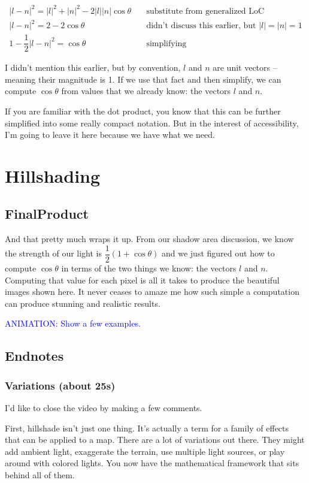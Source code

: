 \documentclass{article}
\newcommand\animation[1]{\textcolor{blue}{ANIMATION: #1}}
\begin{document}
\begin{align*}
|l-n|^2 = |l|^2 + |n|^2 - 2 |l| |n| \cos \theta & \quad \text{substitute from generalized LoC} \\
|l-n|^2 = 2 - 2 \cos \theta & \quad \text{didn't discuss this earlier, but } |l| = |n| = 1 \\
1 - \dfrac{1}{2}|l-n|^2 = \cos \theta & \quad \text{simplifying}
\end{align*}

I didn't mention this earlier, but by convention, $l$ and $n$ are unit vectors -- meaning their magnitude is 1.
If we use that fact and then simplify, we can compute $\cos \theta$ from values that we already know: the vectors $l$ and $n$.

If you are familiar with the dot product, you know that this can be further simplified into some really compact notation.
But in the interest of accessibility, I'm going to leave it here because we have what we need.

\section{Hillshading}

\subsection{FinalProduct}

And that pretty much wraps it up.
From our shadow area discussion, we know the strength of our light is $\dfrac{1}{2}(1 + \cos \theta)$ and we just figured out how to compute $\cos \theta$ in terms of the two things we know: the vectors $l$ and $n$.
Computing that value for each pixel is all it takes to produce the beautiful images shown here.
It never ceases to amaze me how such simple a computation can produce stunning and realistic results.

\animation{Show a few examples.}

\subsection{Endnotes}

\subsubsection{Variations (about 25s)}

I'd like to close the video by making a few comments.

First, hillshade isn't just one thing.
It's actually a term for a family of effects that can be applied to a map.
There are a lot of variations out there.
They might add ambient light, exaggerate the terrain, use multiple light sources, or play around with colored lights.
You now have the mathematical framework that sits behind all of them.
\end{document}
